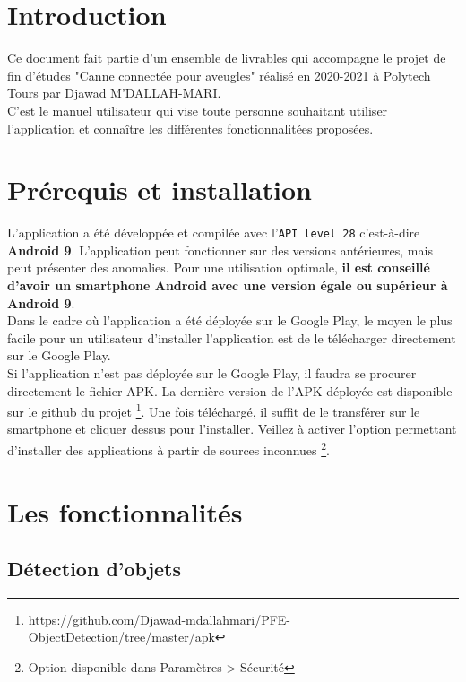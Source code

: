 \documentclass[UTF8]{EPURapport}
\begin{document}
\chapter{Introduction}

Ce document fait partie d'un ensemble de livrables qui accompagne le projet de fin d'études "Canne connectée pour aveugles" réalisé en 2020-2021 à Polytech Tours par Djawad M'DALLAH-MARI.\\

C'est le manuel utilisateur qui vise toute personne souhaitant utiliser l'application et connaître les différentes fonctionnalitées proposées.

\chapter{Prérequis et installation}

L'application a été développée et compilée avec l'\verb|API level 28| c'est-à-dire \textbf{Android 9}. L'application peut fonctionner sur des versions antérieures, mais peut présenter des anomalies.
Pour une utilisation optimale, \textbf{il est conseillé d'avoir un smartphone Android avec une version égale ou supérieur à Android 9}. \\

Dans le cadre où l'application a été déployée sur le Google Play, le moyen le plus facile pour un utilisateur d'installer l'application est de le télécharger directement sur le Google Play.\\

Si l'application n'est pas déployée sur le Google Play, il faudra se procurer directement le fichier APK. La dernière version de l'APK déployée est disponible sur le github du projet \footnote{\url{https://github.com/Djawad-mdallahmari/PFE-ObjectDetection/tree/master/apk}}. Une fois téléchargé, il suffit de le transférer sur le smartphone et cliquer dessus pour l'installer. Veillez à activer l'option permettant d'installer des applications à partir de sources inconnues \footnote{Option disponible dans Paramètres > Sécurité}.

\chapter{Les fonctionnalités}

\section{Détection d'objets}
\end{document}
